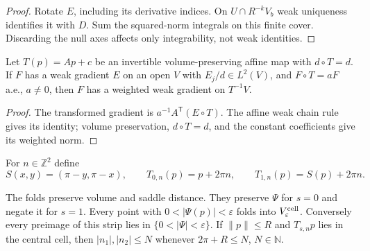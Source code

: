 \begin{proof}
\leanok
Rotate $E$, including its derivative indices.
On $U\cap R^{-k}V_b$ weak uniqueness identifies it with $D$.
Sum the squared-norm integrals on this finite cover.
Discarding the null axes affects only integrability, not weak identities.
\end{proof}

\begin{lemma}
\label{lem:weighted-gradient-affine}
\leanok
Let $T(p)=Ap+c$ be an invertible volume-preserving affine map with
$d\circ T=d$. If $F$ has a weak gradient $E$ on an open $V$ with
$E_j/d\in L^2(V)$, and $F\circ T=aF$ a.e., $a\ne0$, then
$F$ has a weighted weak gradient on $T^{-1}V$.
\end{lemma}

\begin{proof}
\leanok
The transformed gradient is $a^{-1}A^{\mathsf T}(E\circ T)$.
The affine weak chain rule gives its identity; volume preservation,
$d\circ T=d$, and the constant coefficients give its weighted norm.
\end{proof}

\begin{definition}
\label{def:periodic-cell-folds}
\leanok
For $n\in\mathbb Z^2$ define
\[
 S(x,y)=(\pi-y,\pi-x),\qquad
 T_{0,n}(p)=p+2\pi n,\qquad T_{1,n}(p)=S(p)+2\pi n.
\]
\end{definition}

\begin{lemma}
\label{lem:periodic-cell-cover}
\leanok
The folds preserve volume and saddle distance.
They preserve $\Psi$ for $s=0$ and negate it for $s=1$.
Every point with $0<|\Psi(p)|<\varepsilon$ folds into
$V_\varepsilon^{\rm cell}$.
Conversely every preimage of this strip lies in
$\{0<|\Psi|<\varepsilon\}$.
If $\|p\|\le R$ and $T_{s,n}p$ lies in the central cell, then
$|n_1|,|n_2|\le N$ whenever $2\pi+R\le N$, $N\in\mathbb N$.
\end{lemma}

